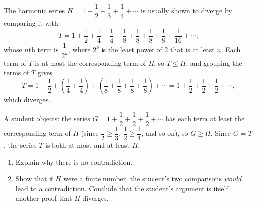 The harmonic series $H=1+\dfrac{1}{2}+\dfrac{1}{3}+\dfrac{1}{4}+\cdots$ is usually shown to diverge by comparing it with
\[T=1+\dfrac{1}{2}+\dfrac{1}{4}+\dfrac{1}{4}+\dfrac{1}{8}+\dfrac{1}{8}+\dfrac{1}{8}+\dfrac{1}{8}+\dfrac{1}{16}+\cdots,\]
whose $n$th term is $\dfrac{1}{2^k}$, where $2^k$ is the least power of $2$ that is at least $n$. Each term of $T$ is at most the corresponding term of $H$, so $T\le H$, and grouping the terms of $T$ gives
\[T=1+\dfrac{1}{2}+\left(\dfrac{1}{4}+\dfrac{1}{4}\right)+\left(\dfrac{1}{8}+\dfrac{1}{8}+\dfrac{1}{8}+\dfrac{1}{8}\right)+\cdots=1+\dfrac{1}{2}+\dfrac{1}{2}+\dfrac{1}{2}+\cdots,\]
which diverges.

A student objects: the series $G=1+\dfrac{1}{2}+\dfrac{1}{2}+\dfrac{1}{2}+\cdots$ has each term at least the corresponding term of $H$ (since $\dfrac{1}{2}\ge\dfrac{1}{3}$, $\dfrac{1}{2}\ge\dfrac{1}{4}$, and so on), so $G\ge H$. Since $G=T$, the series $T$ is both at most and at least $H$.
\begin{enumerate}
\item[(a)] Explain why there is no contradiction.
\item[(b)] Show that if $H$ were a finite number, the student's two comparisons \emph{would} lead to a contradiction. Conclude that the student's argument is itself another proof that $H$ diverges.
\end{enumerate}
